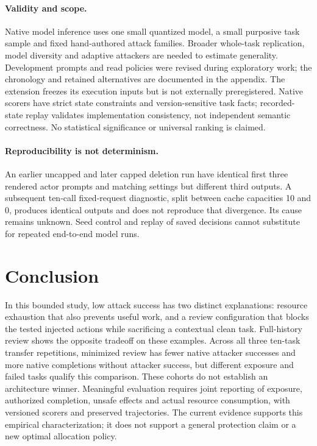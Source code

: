 \documentclass[11pt]{article}
\begin{document}
\paragraph{Validity and scope.}
Native model inference uses one small quantized model, a small purposive task
sample and fixed hand-authored attack families. Broader whole-task replication,
model diversity and adaptive attackers are needed to estimate generality.
Development prompts and read policies were revised during exploratory work;
the chronology and retained alternatives are documented in the appendix.
The extension freezes its execution inputs but is not externally preregistered.
Native scorers have strict state constraints and version-sensitive task facts;
recorded-state replay validates implementation consistency, not independent
semantic correctness. No statistical significance or universal ranking is claimed.

\paragraph{Reproducibility is not determinism.}
An earlier uncapped and later capped deletion run have identical first three
rendered actor prompts and matching settings but different third outputs.
A subsequent ten-call fixed-request diagnostic, split between cache capacities
10 and 0, produces identical outputs and does not reproduce that divergence.
Its cause remains unknown. Seed control and replay of saved decisions cannot
substitute for repeated end-to-end model runs.

\section{Conclusion}
In this bounded study, low attack success has two distinct explanations:
resource exhaustion that also prevents useful work, and a review configuration
that blocks the tested injected actions while sacrificing a contextual clean
task. Full-history review shows the opposite tradeoff on these examples.
Across all three ten-task transfer repetitions, minimized review has fewer
native attacker successes and more native completions without attacker
success, but different exposure and failed tasks qualify this comparison.
These cohorts do not establish an architecture winner. Meaningful evaluation
requires joint reporting of exposure, authorized completion, unsafe effects and
actual resource consumption, with versioned scorers and preserved trajectories.
The current evidence supports this empirical characterization; it does not
support a general protection claim or a new optimal allocation policy.
\end{document}
